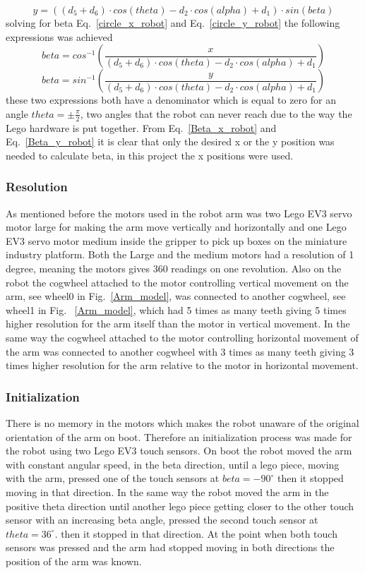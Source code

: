 \begin{equation}
    y = ((d_5 + d_6)\cdot cos(theta) - d_2\cdot cos(alpha) + d_1)\cdot sin(beta)
    \label{circle_y_robot}
\end{equation}
solving for beta Eq.~\eqref{circle_x_robot} and Eq.~\eqref{circle_y_robot} the following expressions was achieved
\begin{equation}
    beta = cos^{-1}(\frac{x}{(d_5 + d_6)\cdot cos(theta) - d_2\cdot cos(alpha) + d_1})
    \label{Beta_x_robot}
\end{equation}
\begin{equation}
    beta = sin^{-1}(\frac{y}{(d_5 + d_6)\cdot cos(theta) - d_2\cdot cos(alpha) + d_1})
    \label{Beta_y_robot}
\end{equation}
these two expressions both have a denominator which is equal to zero for an angle \(theta = \pm \frac{\pi}{2}\), two angles that the robot can never reach due to the way the Lego hardware is put together.
From Eq.~\eqref{Beta_x_robot} and Eq.~\eqref{Beta_y_robot} it is clear that only the desired x or the y position was needed to calculate beta, in this project the x positions were used.
\subsubsection{Resolution}
As mentioned before the motors used in the robot arm was two Lego EV3 servo motor large for making the arm move vertically and horizontally and one Lego EV3 servo motor medium inside the gripper to pick up boxes on the miniature industry platform. Both the Large and the medium motors had a resolution of 1 degree, meaning the motors gives 360 readings on one revolution. Also on the robot the cogwheel attached to the motor controlling vertical movement on the arm, see wheel0 in Fig.~\ref{Arm_model}, was connected to another cogwheel, see wheel1 in Fig.
~\ref{Arm_model}, which had 5 times as many teeth giving 5 times higher resolution for the arm itself than the motor in vertical movement. In the same way the cogwheel attached to the motor controlling horizontal movement of the arm was connected to another cogwheel with 3 times as many teeth giving 3 times higher resolution for the arm relative to the motor in horizontal movement.
\subsubsection{Initialization}
There is no memory in the motors which makes the robot unaware of the original orientation of the arm on boot. Therefore an initialization process was made for the robot using two Lego EV3 touch sensors. On boot the robot moved the arm with constant angular speed, in the beta direction, until a lego piece, moving with the arm, pressed one of the touch sensors at \(beta = -90^{\circ}\) then it stopped moving in that direction. In the same way the robot moved the arm in the positive theta direction until another lego piece getting closer to the other touch sensor with an increasing beta angle, pressed the second touch sensor at \(theta = 36^{\circ}\). then it stopped in that direction. At the point when both touch sensors was pressed and the arm had stopped moving in both directions the position of the arm was known.
